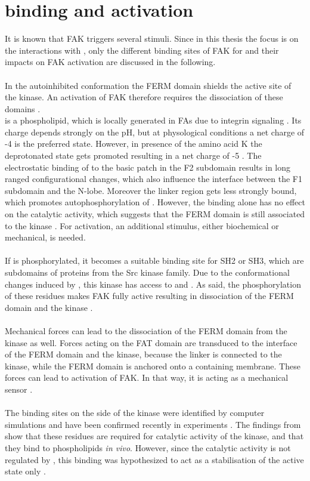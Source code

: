 \section{\pip{} binding and activation}
It is known that FAK triggers several stimuli. Since in this thesis the focus is on the interactions with \pip{}, only the different binding sites of FAK for \pip{} and their impacts on FAK activation are discussed in the following.\\
\\
In the autoinhibited conformation the FERM domain shields the active site of the kinase. An activation of FAK therefore requires the dissociation of these domains \autocite{structFAK}.\\
\pip{} is a phospholipid, which is locally generated in FAs due to integrin signaling \autocite{pip2LocalGeneration}. Its charge depends strongly on the pH, but at physological conditions a net charge of -4 is the preferred state. However, in presence of the amino acid K the deprotonated state gets promoted resulting in a net charge of -5 \autocite{pip2_minus5}. The electrostatic binding of \pip{} to the basic patch in the F2 subdomain results in long ranged configurational changes, which also influence the interface between the F1 subdomain and the N-lobe. Moreover the linker region gets less strongly bound, which promotes autophosphorylation of . However, the \pip{} binding alone has no effect on the catalytic activity, which suggests that the FERM domain is still associated to the kinase \autocites{pap001}{pap003}. For activation, an additional stimulus, either biochemical or mechanical, is needed.\\
\\
If  is phosphorylated, it becomes a suitable binding site for SH2 or SH3, which are subdomains of proteins from the Src kinase family. Due to the conformational changes induced by \pip{}, this kinase has access to  and . As said, the phosphorylation of these residues makes FAK fully active resulting in dissociation of the FERM domain and the kinase \autocite{pap001}.\\
\\
Mechanical forces can lead to the dissociation of the FERM domain from the kinase as well. Forces acting on the FAT domain are transduced to the interface of the FERM domain and the kinase, because the linker is connected to the kinase, while the FERM domain is anchored onto a \pip{} containing membrane. These forces can lead to activation of FAK. In that way, it is acting as a mechanical sensor \autocite{pap004}.\\
\\
The binding sites on the side of the kinase were identified by computer simulations \autocite{pap002} and have been confirmed recently in experiments \autocite{pap002Exp}. The findings from \textcite{pap002Exp} show that these residues are required for catalytic activity of the kinase, and that they bind to phospholipids \textit{in vivo}. However, since the catalytic activity is not regulated by \pip{}, this binding was hypothesized to act as a stabilisation of the active state only \autocite{pap002Exp}.
